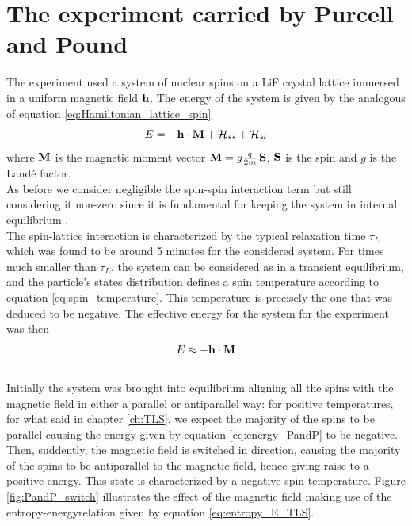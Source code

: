 \section{The experiment carried by Purcell and Pound}
The experiment used a system of nuclear spins on a LiF crystal lattice immersed in a uniform magnetic field $\mathbf{h}$.
The energy of the system is given by the analogous of equation \ref{eq:Hamiltonian_lattice_spin}
\begin{equation*}
    E = - \mathbf{h} \cdot \mathbf{M} + \mathcal{H}_{ss} + \mathcal{H}_{sl}
\end{equation*}
where $\mathbf{M}$ is the magnetic moment vector $\mathbf{M} = g \frac{q}{2m} \, \mathbf{S}$, $\mathbf{S}$ is the spin and $g$ is the Landé factor. \\
As before we consider negligible the spin-spin interaction term but still considering it non-zero since it is fundamental for keeping the system in internal equilibrium \cite{main_article}. \\
The spin-lattice interaction is characterized by the typical relaxation time $\tau_{L}$ which was found to be around 5 minutes for the considered system. For times much smaller than $\tau_L$, 
the system can be considered as in a transient equilibrium, and the particle's states distribution defines a spin temperature according to equation \ref{eq:spin_temperature}. This temperature is precisely the one
that was deduced to be negative. The effective energy for the system for the experiment was then 
\begin{equation}
    E \approx - \mathbf{h} \cdot \mathbf{M}
    \label{eq:energy_PandP}
\end{equation}\\
Initially the system was brought into equilibrium aligning all the spins with the magnetic field in either a parallel or antiparallel way: for positive temperatures, for what said in chapter \ref{ch:TLS}, we expect the majority of the spins to be parallel causing the energy given by 
equation \ref{eq:energy_PandP} to be negative. \\
Then, suddently, the magnetic field is switched in direction, causing the majority of the spins to be antiparallel to the magnetic field, hence giving raise to a positive energy. This state is characterized by a negative spin temperature.
Figure \ref{fig:PandP_switch} illustrates the effect of the magnetic field making use of the entropy-energyrelation given by equation \ref{eq:entropy_E_TLS}.
